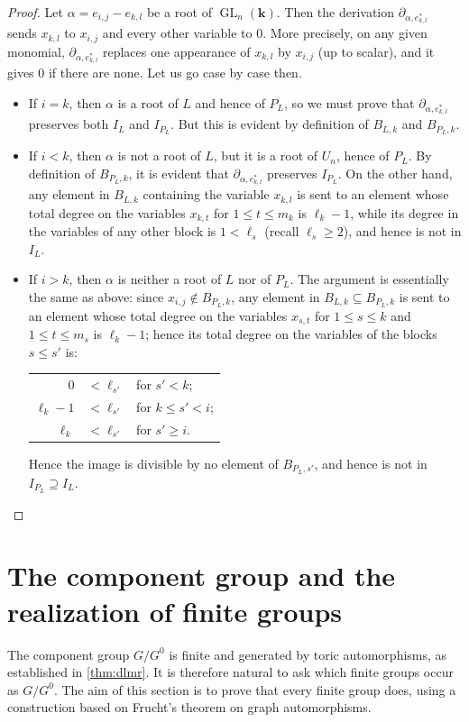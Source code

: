 \documentclass[11pt,letterpaper,reqno]{amsart}
\theoremstyle{remark}
\theoremstyle{definition}
\newcommand{\KK}[0]{\ensuremath{\mathbf{k}}}
\newcommand{\GL}[0]{\ensuremath{\operatorname{GL}}}
\begin{document}
\begin{proof}
Let $\alpha=e_{i,j}-e_{k,l}$ be a root of $\GL_n(\KK)$. Then the derivation $\partial_{\alpha,e_{k,l}^*}$ sends $x_{k,l}$ to $x_{i,j}$ and every other variable to $0$. More precisely, on any given monomial, $\partial_{\alpha,e_{k,l}^*}$ replaces one appearance of $x_{k,l}$ by $x_{i,j}$ (up to scalar), and it gives $0$ if there are none. Let us go case by case then.
\begin{itemize}
    \item If $i=k$, then $\alpha$ is a root of $L$ and hence of $P_L$, so we must prove that $\partial_{\alpha,e_{k,l}^*}$ preserves both $I_L$ and $I_{P_L}$. But this is evident by definition of $B_{L,k}$ and $B_{P_L,k}$.
    \item If $i<k$, then $\alpha$ is not a root of $L$, but it is a root of $U_n$, hence of $P_L$. By definition of $B_{P_L,k}$, it is evident that $\partial_{\alpha,e_{k,l}^*}$ preserves $I_{P_L}$. On the other hand, any element in $B_{L,k}$ containing the variable $x_{k,l}$ is sent to an element whose total degree on the variables $x_{k,t}$ for $1\leq t\leq m_k$ is $\ell_{k}-1$, while its degree in the variables of any other block is $1<\ell_s$ (recall $\ell_s\geq2$), and hence is not in $I_L$.
    \item If $i>k$, then $\alpha$ is neither a root of $L$ nor of $P_L$. The argument is essentially the same as above: since $x_{i,j}\not\in B_{P_L,k}$, any element in $B_{L,k}\subseteq B_{P_L,k}$ is sent to an element whose total degree on the variables $x_{s,t}$ for $1\leq s\leq k$ and $1\leq t\leq m_s$ is $\ell_{k}-1$; hence its total degree on the variables of the blocks $s\leq s'$ is:\\
    \begin{center}
    \begin{tabular}{rll}
        $0$ & $<\ell_{s'}$ & for $s'<k$;\\
        $\ell_k-1$ & $<\ell_{s'}$ & for $k\leq s'<i$;\\
        $\ell_k$ & $<\ell_{s'}$ & for $s'\geq i$.
    \end{tabular}
    \end{center}
    Hence the image is divisible by no element of $B_{P_L,s'}$, and hence is not in $I_{P_L}\supseteq I_L$.
\end{itemize}

\end{proof}

\section{The component group and the realization of finite groups}\label{sec:fin-groups}
The component group $G/G^0$ is finite and generated by toric automorphisms, as established in \cref{thm:dlmr}. It is therefore natural to ask which finite groups occur as $G/G^0$. The aim of this section is to prove that every finite group does, using a construction based on Frucht's theorem on graph automorphisms.
\end{document}
